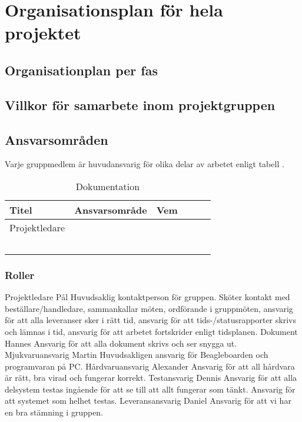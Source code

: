 \section{Organisationsplan för hela projektet}

\subsection{Organisationplan per fas}

\subsection{Villkor för samarbete inom projektgruppen}

\subsection{Ansvarsområden}
Varje gruppmedlem är huvudansvarig för olika delar av arbetet enligt tabell .

\begin{table}[h]
  \centering
    \begin{tabularx}{\textwidth}{| l | l | X | l | l | l |}
      \hline
      \textbf{Titel} & \textbf{Ansvarsområde} & \textbf{Vem} \\
      \hline
      {Projektledare} & {} & {} \\\hline
      {} & {} & {} \\\hline
      {} & {} & {} \\\hline
      {} & {} & {} \\\hline
      {} & {} & {} \\\hline
      {} & {} & {} \\\hline
    \end{tabularx}
  \caption{Dokumentation} \label{dokumentation:tabell}
\end{table}


\subsubsection{Roller}
Projektledare Pål
  Huvudsaklig kontaktperson för gruppen. Sköter kontakt med beställare/handledare, sammankallar möten, ordförande i gruppmöten, ansvarig för att alla leveranser sker i rätt tid, ansvarig för att tids-/statusrapporter skrivs och lämnas i tid, ansvarig för att arbetet fortskrider enligt tidsplanen.
Dokument  Hannes
  Ansvarig för att alla dokument skrivs och ser snygga ut. 
Mjukvaruansvarig  Martin
  Huvudsakligen ansvarig för Beagleboarden och programvaran på PC.
Hårdvaruansvarig  Alexander
  Ansvarig för att all hårdvara är rätt, bra virad och fungerar korrekt.
Testansvarig  Dennis
  Ansvarig för att alla delsystem testas ingående för att se till att allt fungerar som tänkt. Ansvarig för att systemet som helhet testas.
Leveransansvarig  Daniel
  Ansvarig för att vi har en bra stämning i gruppen.